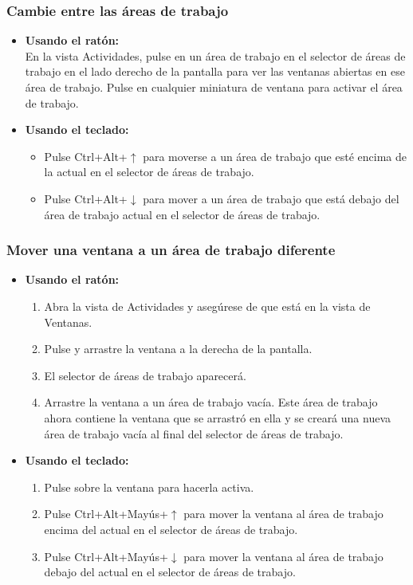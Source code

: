 \subsubsection{Cambie entre las áreas de trabajo}
\begin{itemize}
\item {\bf Usando el ratón:}\\
En la vista Actividades, pulse en un área de trabajo en el selector de áreas de trabajo en el lado derecho de la pantalla para ver las ventanas abiertas en ese área de trabajo. Pulse en cualquier miniatura de ventana para activar el área de trabajo.\\

\item {\bf Usando el teclado:}
\begin{itemize}
\item Pulse Ctrl+Alt+$↑$ para moverse a un área de trabajo que esté encima de la actual en el selector de áreas de trabajo.
\item Pulse Ctrl+Alt+$↓$ para mover a un área de trabajo que está debajo del área de trabajo actual en el selector de áreas de trabajo.
\end{itemize}
\end{itemize}
\subsubsection{Mover una ventana a un área de trabajo diferente}
\begin{itemize}
\item {\bf Usando el ratón:}
\begin{enumerate}
\item Abra la vista de Actividades y asegúrese de que está en la vista de Ventanas.
\item Pulse y arrastre la ventana a la derecha de la pantalla.
\item El selector de áreas de trabajo aparecerá.
\item Arrastre la ventana a un área de trabajo vacía. Este área de trabajo ahora contiene la ventana que se arrastró en ella y se creará una nueva área de trabajo vacía al final del selector de áreas de trabajo.
\end{enumerate}
\item {\bf Usando el teclado:}
\begin{enumerate}
\item Pulse sobre la ventana para hacerla activa.
\item Pulse Ctrl+Alt+Mayús+$↑$ para mover la ventana al área de trabajo encima del actual en el selector de áreas de trabajo.
\item Pulse Ctrl+Alt+Mayús+$↓$ para mover la ventana al área de trabajo debajo del actual en el selector de áreas de trabajo.
\end{enumerate}
\end{itemize}